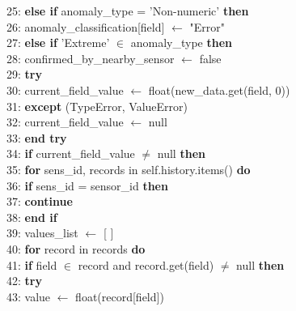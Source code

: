 \begin{breakablealgorithm}
\begin{flushleft}
25: \hspace{1em} \textbf{else if} anomaly\_type = 'Non-numeric' \textbf{then} \\
26: \hspace{1.5em} anomaly\_classification[field] $\gets$ "Error" \\
27: \hspace{1em} \textbf{else if} 'Extreme' $\in$ anomaly\_type \textbf{then} \\
28: \hspace{1.5em} confirmed\_by\_nearby\_sensor $\gets$ false \\
29: \hspace{1.5em} \textbf{try} \\
30: \hspace{2em} current\_field\_value $\gets$ float(new\_data.get(field, 0)) \\
31: \hspace{1.5em} \textbf{except} (TypeError, ValueError) \\
32: \hspace{2em} current\_field\_value $\gets$ null \\
33: \hspace{1.5em} \textbf{end try} \\
34: \hspace{1.5em} \textbf{if} current\_field\_value $\neq$ null \textbf{then} \\
35: \hspace{2em} \textbf{for} sens\_id, records in self.history.items() \textbf{do} \\
36: \hspace{2.5em} \textbf{if} sens\_id = sensor\_id \textbf{then} \\
37: \hspace{3em} \textbf{continue} \\
38: \hspace{2.5em} \textbf{end if} \\
39: \hspace{2.5em} values\_list $\gets$ [ ] \\
40: \hspace{2.5em} \textbf{for} record in records \textbf{do} \\
41: \hspace{3em} \textbf{if} field $\in$ record and record.get(field) $\neq$ null \textbf{then} \\
42: \hspace{3.5em} \textbf{try} \\
43: \hspace{4em} value $\gets$ float(record[field]) \\

\end{flushleft}
\end{breakablealgorithm}
